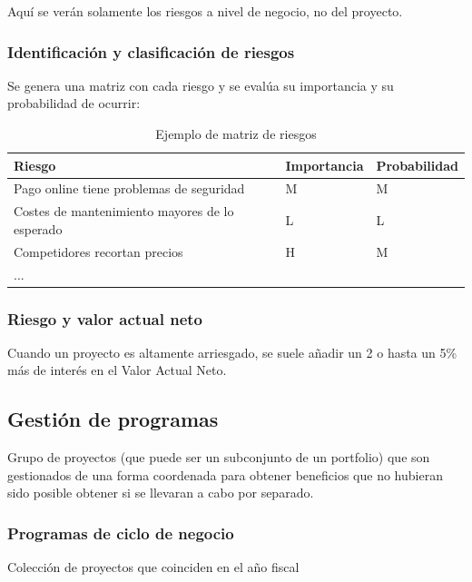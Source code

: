 \documentclass[12pt]{article}
\begin{document}
{Aquí se verán solamente los riesgos a nivel de negocio, no del proyecto.}

\subsubsection{Identificación y clasificación de riesgos}
\label{2.6.1}

{Se genera una matriz con cada riesgo y se evalúa su importancia y su probabilidad de ocurrir:}

\begin{table}[ht]
\centering
\begin{tabular}{lll}
Riesgo                                         & Importancia & Probabilidad \\ \hline
Pago online tiene problemas de seguridad       & M           & M            \\
Costes de mantenimiento mayores de lo esperado & L           & L            \\
Competidores recortan precios                  & H           & M            \\
...                                            &             &             
\end{tabular}
\caption{Ejemplo de matriz de riesgos}
\label{tab:2.3}
\end{table}

\subsubsection{Riesgo y valor actual neto}
\label{2.6.2}

{Cuando un proyecto es altamente arriesgado, se suele añadir un 2 o hasta un 5\% más de interés en el Valor Actual Neto.}

\subsection{Gestión de programas}
\label{2.7.0}

{Grupo de proyectos (que puede ser un subconjunto de un portfolio) que son gestionados de una forma coordenada para obtener beneficios que no hubieran sido posible obtener si se llevaran a cabo por separado.}

\subsubsection{Programas de ciclo de negocio}
\label{2.7.1}

{Colección de proyectos que coinciden en el año fiscal}
\end{document}

